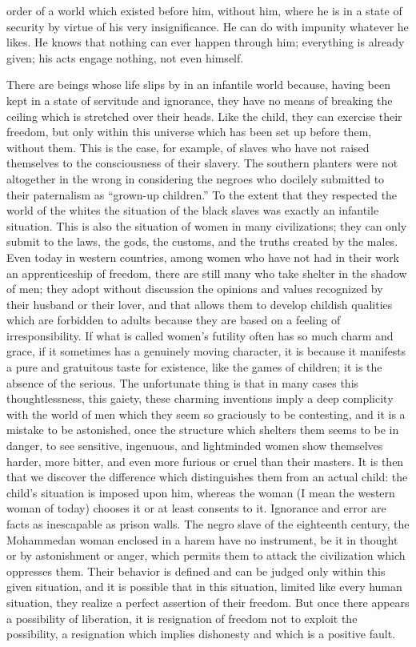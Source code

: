 \documentclass[11pt]{article}
\begin{document}
order of a world which existed before him, without him, where he is in a state of security by virtue of his very insignificance. He can do with impunity whatever he likes. He knows that nothing can ever happen through him; everything is already given; his acts engage nothing, not even himself.

There are beings whose life slips by in an infantile world because, having been kept in a state of servitude and ignorance, they have no means of breaking the ceiling which is stretched over their heads. Like the child, they can exercise their freedom, but only within this universe which has been set up before them, without them. This is the case, for example, of slaves who have not raised themselves to the consciousness of their slavery. The southern planters were not altogether in the wrong in considering the negroes who docilely submitted to their paternalism as “grown-up children.” To the extent that they respected the world of the whites the situation of the black slaves was exactly an infantile situation. This is also the situation of women in many civilizations; they can only submit to the laws, the gods, the customs, and the truths created by the males. Even today in western countries, among women who have not had in their work an apprenticeship of freedom, there are still many who take shelter in the shadow of men; they adopt without discussion the opinions and values recognized by their husband or their lover, and that allows them to develop childish qualities which are forbidden to adults because they are based on a feeling of irresponsibility. If what is called women’s futility often has so much charm and grace, if it sometimes has a genuinely moving character, it is because it manifests a pure and gratuitous taste for existence, like the games of children; it is the absence of the serious. The unfortunate thing is that in many cases this thoughtlessness, this gaiety, these charming inventions imply a deep complicity with the world of men which they seem so graciously to be contesting, and it is a mistake to be astonished, once the structure which shelters them seems to be in danger, to see sensitive, ingenuous, and lightminded women show themselves harder, more bitter, and even more furious or cruel than their masters. It is then that we discover the difference which distinguishes them from an actual child: the child’s situation is imposed upon him, whereas the woman (I mean the western woman of today) chooses it or at least consents to it. Ignorance and error are facts as inescapable as prison walls. The negro slave of the eighteenth century, the Mohammedan woman enclosed in a harem have no instrument, be it in thought or by astonishment or anger, which permits them to attack the civilization which oppresses them. Their behavior is defined and can be judged only within this given situation, and it is possible that in this situation, limited like every human situation, they realize a perfect assertion of their freedom. But once there appears a possibility of liberation, it is resignation of freedom not to exploit the possibility, a resignation which implies dishonesty and which is a positive fault.
\end{document}
